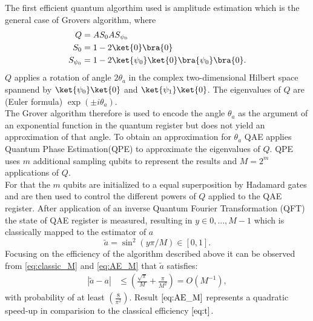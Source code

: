 \documentclass[../../main.tex]{subfiles}
\begin{document}
The first efficient quantum algorthim used is amplitude estimation which is the general case of Grovers algorithm, where
\begin{align}
  Q &= AS_0AS_{\psi_0} \nonumber \\
  S_0 &= 1-2\ket{0}\bra{0} \nonumber \\
  S_{\psi_0} &= 1-2\ket{\psi_0}\ket{0}\bra{\psi_0}\bra{0}. \nonumber \\
\end{align}
$Q$ applies a rotation of angle $2\theta_a$ in the complex two-dimensional Hilbert space spannend by $\ket{\psi_0}\ket{0}$ and
$\ket{\psi_1}\ket{0}$. The eigenvalues of $Q$ are (Euler formula) $\exp{ (\pm i \theta_a)}$.\\
The Grover algorithm therefore is used to encode the angle $\theta_a$ as the argument of an exponential function in the quantum register but does not yield an approximation of that angle.
To obtain an approximation for $\theta_a$ QAE applies Quantum Phase Estimation(QPE) to approximate the eigenvalues of $Q$.
QPE uses $m$ additional sampling qubits to represent the results and $M=2^m$ applications of $Q$.\\
For that the $m$ qubits are initialized to a equal superposition by Hadamard gates and are then used to control the different powers of $Q$
applied to the QAE register. After application of an inverse Quantum Fourier Transformation (QFT) the state of QAE register is measured, resulting in
$y \in {0,..., M-1}$ which is classically mapped to the estimator of $a$
\begin{equation}
  \tilde{a} = \sin^2(y \pi / M) \in [0,1] \label{eq:estimate_a}.
\end{equation}
Focusing on the efficiency of the algorithm described above it can be observed from \ref{eq:classic_M} and \ref{eq:AE_M} that $\tilde{a}$
satisfies:
\begin{align}
    | \tilde{a} - a | &\leq (\frac{\sqrt{\pi}}{M} + \frac{\pi}{M^2}) = O(M^{-1}), \label{eq:AE_M}
\end{align}
with probability of at least $(\frac{8}{\pi^2})$. Result $\ref{eq:AE_M}$ represents a quadratic speed-up in comparision to the classical efficiency $\ref{eq:t}$.
\end{document}
